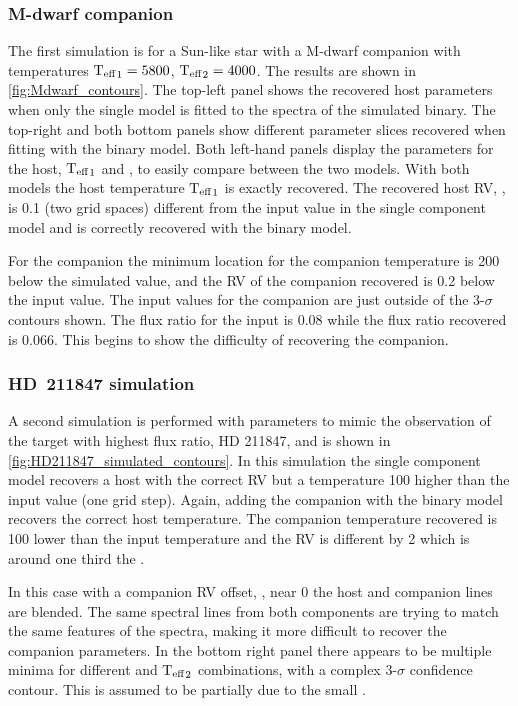\subsubsection*{M-dwarf companion}
The first simulation is for a Sun-like star with a M-dwarf companion with temperatures \({\textrm{T}_{\mathrm{eff}}}_{1} = 5800\)\K{}, \({\textrm{T}_{\mathrm{eff}}}_{2} = 4000\)\K{}.
The results are shown in \cref{fig:Mdwarf_contours}.
The top-left panel shows the recovered host parameters when only the single model is fitted to the spectra of the simulated binary.
The top-right and both bottom panels show different parameter slices recovered when fitting with the binary model.
Both left-hand panels display the parameters for the host, \({\textrm{T}_{\mathrm{eff}}}_{1}\) and \Rvone{}, to easily compare between the two models.
With both models the host temperature \({\textrm{T}_{\mathrm{eff}}}_{1}\) is exactly recovered.
The recovered host {RV}, \Rvone{}, is 0.1\kmps{} (two grid spaces) different from the input value in the single component model and is correctly recovered with the binary model.

For the companion the minimum \textchisquared{} location for the companion temperature is 200\K{} below the simulated value, and the {RV} of the companion recovered is 0.2\kmps{} below the input value.
The input values for the companion are just outside of the 3-\(\sigma\) contours shown.
The flux ratio for the input is 0.08 while the flux ratio recovered is 0.066.
This begins to show the difficulty of recovering the companion.

\subsubsection*{{HD~211847} simulation}
A second simulation is performed with parameters to mimic the observation of the target with highest flux ratio, {HD 211847}, and is shown in \cref{fig:HD211847_simulated_contours}.
In this simulation the single component model recovers a host with the correct {RV} but a temperature 100\K{} higher than the input value (one grid step).
Again, adding the companion with the binary model recovers the correct host temperature.
The companion temperature recovered is 100\K{} lower than the input temperature and the {RV} is different by 2\kmps{} which is around one third the {\fwhm}.

In this case with a companion {RV} offset, \Rvtwo{}, near 0\kmps{} the host and companion lines are blended.
The same spectral lines from both components are trying to match the same features of the spectra, making it more difficult to recover the companion parameters.
In the bottom right panel there appears to be multiple minima for different \Rvtwo{} and \({\textrm{T}_{\mathrm{eff}}}_{2}\) combinations, with a complex 3-\(\sigma\) confidence contour.
This is assumed to be partially due to the small \Rvtwo{}.


